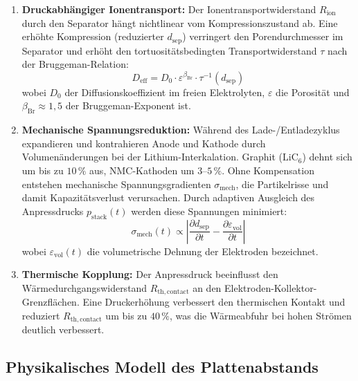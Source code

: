 ﻿\documentclass[12pt,a4paper]{article}
\begin{document}
\begin{enumerate}[leftmargin=*, label=(\arabic*)]
	\item \textbf{Druckabhängiger Ionentransport:} Der Ionentransportwiderstand $R_\mathrm{ion}$
	durch den Separator hängt nichtlinear vom Kompressionszustand ab. Eine erhöhte
	Kompression (reduzierter $d_\mathrm{sep}$) verringert den Porendurchmesser im
	Separator und erhöht den tortuositätsbedingten Transportwiderstand $\tau$
	nach der Bruggeman-Relation:
	\begin{equation}
		D_\mathrm{eff} = D_0 \cdot \varepsilon^{\beta_\mathrm{Br}} \cdot \tau^{-1}(d_\mathrm{sep})
		\label{eq:bruggeman}
	\end{equation}
	wobei $D_0$ der Diffusionskoeffizient im freien Elektrolyten, $\varepsilon$ die
	Porosität und $\beta_\mathrm{Br} \approx 1{,}5$ der Bruggeman-Exponent ist.

	\item \textbf{Mechanische Spannungsreduktion:} Während des Lade-/Entladezyklus
	expandieren und kontrahieren Anode und Kathode durch Volumenänderungen bei der
	Lithium-Interkalation. Graphit ($\mathrm{LiC_6}$) dehnt sich um bis zu $10\,\%$
	aus, NMC-Kathoden um $3\text{--}5\,\%$. Ohne Kompensation entstehen mechanische
	Spannungsgradienten $\sigma_\mathrm{mech}$, die Partikelrisse und damit
	Kapazitätsverlust verursachen. Durch adaptiven Ausgleich des Anpressdrucks
	$p_\mathrm{stack}(t)$ werden diese Spannungen minimiert:
	\begin{equation}
		\sigma_\mathrm{mech}(t) \propto \left|\frac{\partial d_\mathrm{sep}}{\partial t}
		- \frac{\partial \varepsilon_\mathrm{vol}}{\partial t}\right|
		\label{eq:mech_stress}
	\end{equation}
	wobei $\varepsilon_\mathrm{vol}(t)$ die volumetrische Dehnung der Elektroden
	bezeichnet.

	\item \textbf{Thermische Kopplung:} Der Anpressdruck beeinflusst den
	Wärmedurchgangswiderstand $R_\mathrm{th,contact}$ an den Elektroden-Kollektor-Grenzflächen.
	Eine Druckerhöhung verbessert den thermischen Kontakt und reduziert
	$R_\mathrm{th,contact}$ um bis zu $40\,\%$, was die Wärmeabfuhr bei hohen
	Strömen deutlich verbessert.
\end{enumerate}

\subsection{Physikalisches Modell des Plattenabstands}
\end{document}
